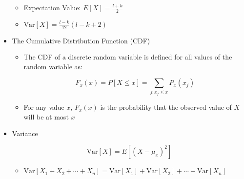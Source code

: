 \begin{itemize}
\begin{itemize}
        \item Expectation Value: $E[X]=\frac{l+k}{2}$

        \item $\text{Var}[X]=\frac{l-k}{12}(l-k+2)$

    \end{itemize}

  \item The Cumulative Distribution Function (CDF)

    \begin{itemize}

      \item The CDF of a discrete random variable is defined for all values of the random variable as:

        $$F_x(x)=P[X\leq x]=\sum_{j:x_j\leq x}P_x(x_j)$$

      \item For any value $x$, $F_x(x)$ is the probability that the observed value of $X$ will be at most $x$

    \end{itemize}

  \item Variance

    $$\text{Var}[X]=E[(X-\mu_x)^2]$$

    \begin{itemize}

      \item $\text{Var}[X_1+X_2+\cdots+X_n]=\text{Var}[X_1]+\text{Var}[X_2]+\cdots+\text{Var}[X_n]$

    \end{itemize}

\end{itemize}



